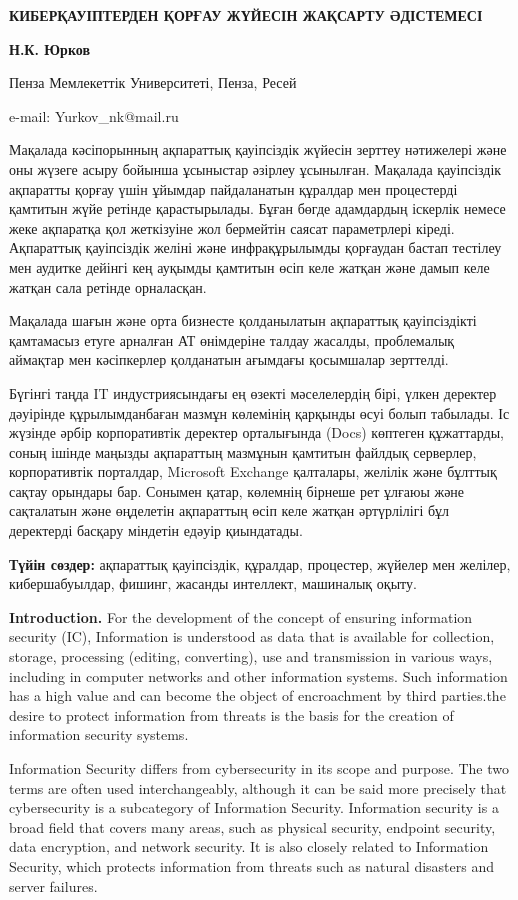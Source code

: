 \textbf{КИБЕРҚАУІПТЕРДЕН ҚОРҒАУ ЖҮЙЕСІН ЖАҚСАРТУ ӘДІСТЕМЕСІ}

\textbf{Н.К. Юрков}

Пенза Мемлекеттік Университеті, Пенза, Ресей

e-mail: Yurkov\_nk@mail.ru

Мақалада кәсіпорынның ақпараттық қауіпсіздік жүйесін зерттеу нәтижелері
және оны жүзеге асыру бойынша ұсыныстар әзірлеу ұсынылған. Мақалада
қауіпсіздік ақпаратты қорғау үшін ұйымдар пайдаланатын құралдар мен
процестерді қамтитын жүйе ретінде қарастырылады. Бұған бөгде адамдардың
іскерлік немесе жеке ақпаратқа қол жеткізуіне жол бермейтін саясат
параметрлері кіреді. Ақпараттық қауіпсіздік желіні және инфрақұрылымды
қорғаудан бастап тестілеу мен аудитке дейінгі кең ауқымды қамтитын өсіп
келе жатқан және дамып келе жатқан сала ретінде орналасқан.

Мақалада шағын және орта бизнесте қолданылатын ақпараттық қауіпсіздікті
қамтамасыз етуге арналған АТ өнімдеріне талдау жасалды, проблемалық
аймақтар мен кәсіпкерлер қолданатын ағымдағы қосымшалар зерттелді.

Бүгінгі таңда IT индустриясындағы ең өзекті мәселелердің бірі, үлкен
деректер дәуірінде құрылымданбаған мазмұн көлемінің қарқынды өсуі болып
табылады. Іс жүзінде әрбір корпоративтік деректер орталығында (Docs)
көптеген құжаттарды, соның ішінде маңызды ақпараттың мазмұнын қамтитын
файлдық серверлер, корпоративтік порталдар, Microsoft Exchange
қалталары, желілік және бұлттық сақтау орындары бар. Сонымен қатар,
көлемнің бірнеше рет ұлғаюы және сақталатын және өңделетін ақпараттың
өсіп келе жатқан әртүрлілігі бұл деректерді басқару міндетін едәуір
қиындатады.

\textbf{Түйін сөздер:} ақпараттық қауіпсіздік, құралдар, процестер,
жүйелер мен желілер, кибершабуылдар, фишинг, жасанды интеллект,
машиналық оқыту.

\textbf{Introduction.} For the development of the concept of ensuring
information security (IC), Information is understood as data that is
available for collection, storage, processing (editing, converting), use
and transmission in various ways, including in computer networks and
other information systems. Such information has a high value and can
become the object of encroachment by third parties.the desire to protect
information from threats is the basis for the creation of information
security systems.

Information Security differs from cybersecurity in its scope and
purpose. The two terms are often used interchangeably, although it can
be said more precisely that cybersecurity is a subcategory of
Information Security. Information security is a broad field that covers
many areas, such as physical security, endpoint security, data
encryption, and network security. It is also closely related to
Information Security, which protects information from threats such as
natural disasters and server failures.

